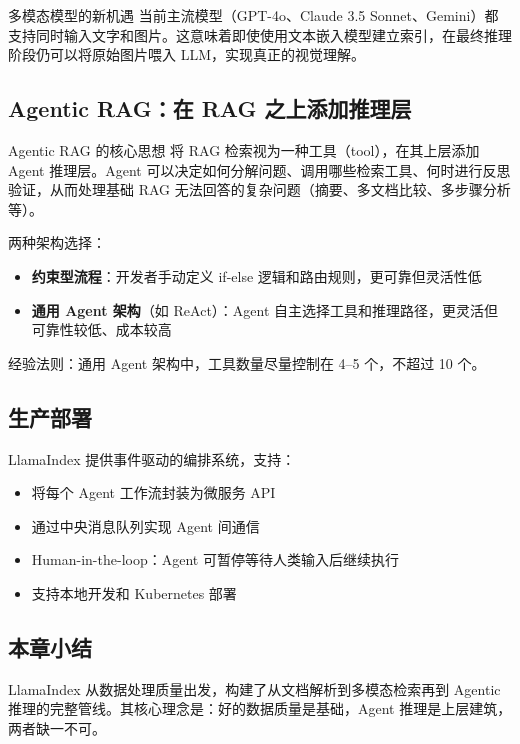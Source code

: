 \documentclass[a4paper]{article}
\begin{document}
\begin{knowledgebox}{多模态模型的新机遇}
当前主流模型（GPT-4o、Claude 3.5 Sonnet、Gemini）都支持同时输入文字和图片。这意味着即使使用文本嵌入模型建立索引，在最终推理阶段仍可以将原始图片喂入 LLM，实现真正的视觉理解。
\end{knowledgebox}

\subsection{Agentic RAG：在 RAG 之上添加推理层}

\begin{importantbox}{Agentic RAG 的核心思想}
将 RAG 检索视为一种工具（tool），在其上层添加 Agent 推理层。Agent 可以决定如何分解问题、调用哪些检索工具、何时进行反思验证，从而处理基础 RAG 无法回答的复杂问题（摘要、多文档比较、多步骤分析等）。
\end{importantbox}

两种架构选择：
\begin{itemize}
    \item \textbf{约束型流程}：开发者手动定义 if-else 逻辑和路由规则，更可靠但灵活性低
    \item \textbf{通用 Agent 架构}（如 ReAct）：Agent 自主选择工具和推理路径，更灵活但可靠性较低、成本较高
\end{itemize}

经验法则：通用 Agent 架构中，工具数量尽量控制在 4--5 个，不超过 10 个。

\subsection{生产部署}

LlamaIndex 提供事件驱动的编排系统，支持：
\begin{itemize}
    \item 将每个 Agent 工作流封装为微服务 API
    \item 通过中央消息队列实现 Agent 间通信
    \item Human-in-the-loop：Agent 可暂停等待人类输入后继续执行
    \item 支持本地开发和 Kubernetes 部署
\end{itemize}

\subsection{本章小结}

LlamaIndex 从数据处理质量出发，构建了从文档解析到多模态检索再到 Agentic 推理的完整管线。其核心理念是：好的数据质量是基础，Agent 推理是上层建筑，两者缺一不可。
\end{document}
